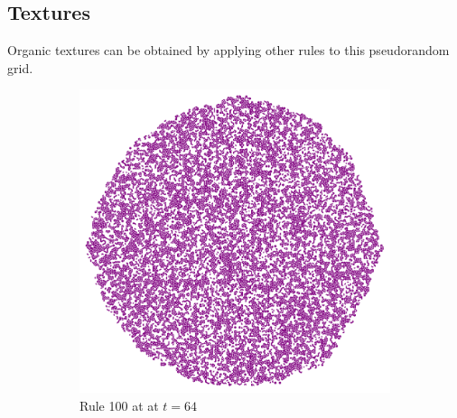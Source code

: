 \documentclass{article}
\begin{document}
\vspace{5pt}

\subsection{Textures} \label{textures}
Organic textures can be obtained by applying other rules to this pseudorandom grid.

\begin{figure}[H]
    \centering
    \begin{subfigure}[b]{0.32\textwidth}
        \centering
        \includegraphics[width=\textwidth]{graphics/behavior/textures/rule-100-time-64-noise.pdf}
        \caption{Rule 100 at at $t=64$}
        \label{fig:rule-100-time-64-noise}
    \end{subfigure}
    \begin{subfigure}[b]{0.32\textwidth}
        \centering

\end{subfigure}
\end{figure}
\end{document}
